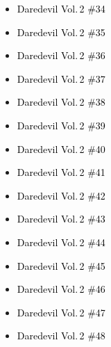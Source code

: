 \documentclass[12pt]{article}
\newcommand{\checkbox}{\raisebox{0.0ex}{\fbox{\rule{0ex}{1.5ex} \rule{1.5ex}{0ex}}}}
\begin{document}
\vspace{0.3cm}
\noindent
\begin{tcolorbox}[
  colback=white!95!gray,
  colframe=black,
  width=\textwidth,
  arc=4mm,
  auto outer arc,
  boxrule=0.8pt,
  left=8pt,right=8pt,top=8pt,bottom=8pt
]
\begin{itemize}[left=0pt,label={\checkbox}]
    \item \textcolor{black}{Daredevil Vol.\,2 \#34}
    \item \textcolor{black}{Daredevil Vol.\,2 \#35}
    \item \textcolor{black}{Daredevil Vol.\,2 \#36}
    \item \textcolor{black}{Daredevil Vol.\,2 \#37}
    \item \textcolor{black}{Daredevil Vol.\,2 \#38}
    \item \textcolor{black}{Daredevil Vol.\,2 \#39}
    \item \textcolor{black}{Daredevil Vol.\,2 \#40}
    \item \textcolor{black}{Daredevil Vol.\,2 \#41}
    \item \textcolor{black}{Daredevil Vol.\,2 \#42}
    \item \textcolor{black}{Daredevil Vol.\,2 \#43}
    \item \textcolor{black}{Daredevil Vol.\,2 \#44}
    \item \textcolor{black}{Daredevil Vol.\,2 \#45}
    \item \textcolor{black}{Daredevil Vol.\,2 \#46}
    \item \textcolor{black}{Daredevil Vol.\,2 \#47}
    \item \textcolor{black}{Daredevil Vol.\,2 \#48}
\end{itemize}
\end{tcolorbox}

\newpage
{}
\end{document}

